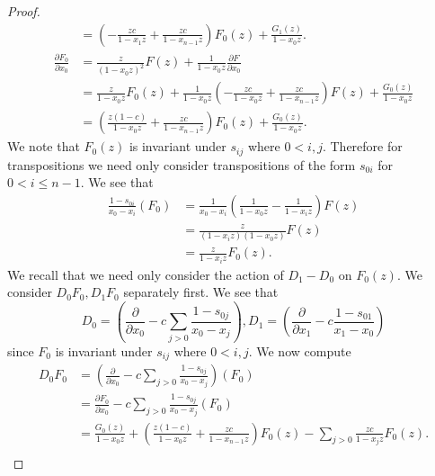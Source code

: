 \documentclass{amsart}
\numberwithin{equation}{section}
\theoremstyle{definition}
\begin{document}
\begin{proof}
\begin{align*}
&=\left(-\frac{zc}{1-x_1z}+\frac{zc}{1-x_{n-1}z}\right)F_0(z)+\frac{G_1(z)}{1-x_0z}.\\
\frac{\partial F_0}{\partial x_0}%
&=\frac{z}{(1-x_0z)^2}F(z)+\frac{1}{1-x_0z}\frac{\partial F}{\partial x_0}\\
&=\frac{z}{1-x_0z}F_0(z)+\frac{1}{1-x_0z}\left(-\frac{zc}{1-x_0z}+\frac{zc}{1-x_{n-1}z}\right)F(z)+\frac{G_0(z)}{1-x_0z}\\
&=\left(\frac{z(1-c)}{1-x_0z}+\frac{zc}{1-x_{n-1}z}\right)F_0(z)+\frac{G_0(z)}{1-x_0z}.
\end{align*}
We note that $F_0(z)$ is invariant under $s_{ij}$ where $0 < i,j$. Therefore for transpositions we need only consider transpositions of the form $s_{0i}$ for $0 < i \le n-1$. We see that 
\begin{align*}
\frac{1-s_{0i}}{x_0-x_i}(F_0)%
&=\frac{1}{x_0-x_i}\left(\frac{1}{1-x_0z}-\frac{1}{1-x_iz}\right)F(z)\\
&=\frac{z}{(1-x_iz)(1-x_0z)}F(z)\\
&=\frac{z}{1-x_iz}F_0(z).
\end{align*}
We recall that we need only consider the action of $D_1-D_0$ on $F_0(z)$. We consider $D_0F_0, D_1F_0$ separately first. We see that 
\[
D_0=\left(\frac{\partial}{\partial x_0}-c\sum_{j > 0} \frac{1-s_{0j}}{x_0-x_j}\right), D_1=\left(\frac{\partial}{\partial x_1}-c \frac{1-s_{01}}{x_1-x_0}\right)
\]
since $F_0$ is invariant under $s_{ij}$ where $0 < i,j$. We now compute
\begin{align*}
D_0F_0&=\left(\frac{\partial}{\partial x_0}-c\sum_{j > 0} \frac{1-s_{0j}}{x_0-x_j}\right)(F_0)\\
&=\frac{\partial F_0}{\partial x_0}-c\sum_{j > 0} \frac{1-s_{0j}}{x_0-x_j}(F_0)\\
&=\frac{G_0(z)}{1-x_0z}+\left(\frac{z(1-c)}{1-x_0z}+\frac{zc}{1-x_{n-1}z}\right)F_0(z)-\sum_{j > 0} \frac{zc}{1-x_jz}F_0(z).\\

\end{align*}
\end{proof}
\end{document}
